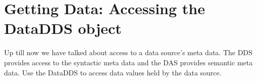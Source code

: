 \documentclass{dods-paper}
\begin{document}












\section{Getting Data: Accessing the DataDDS object}

Up till now we have talked about access to a data source's meta data. The DDS
provides access to the syntactic meta data and the DAS provides semantic meta
data. Use the DataDDS to access data values held by the data source.
\end{document}
